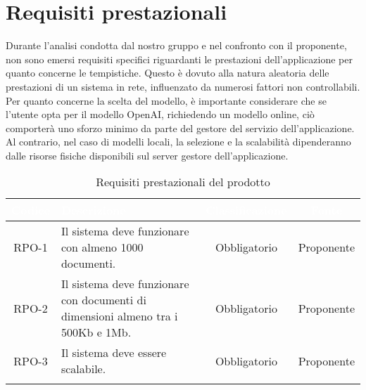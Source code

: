 \section{Requisiti prestazionali}

Durante l'analisi condotta dal nostro gruppo e nel confronto con il proponente, non sono emersi requisiti specifici riguardanti le prestazioni dell'applicazione per quanto concerne le tempistiche. Questo è dovuto alla natura aleatoria delle prestazioni di un sistema in rete, influenzato da numerosi fattori non controllabili.\\Per quanto concerne la scelta del modello, è importante considerare che se l'utente opta per il modello OpenAI, richiedendo un modello online, ciò comporterà uno sforzo minimo da parte del gestore del servizio dell'applicazione. Al contrario, nel caso di modelli locali, la selezione e la scalabilità dipenderanno dalle risorse fisiche disponibili sul server gestore dell'applicazione.\\
\begingroup
\setlength{\tabcolsep}{10pt}
\renewcommand{\arraystretch}{1.5}
\begin{xltabular}{\textwidth}{| c | X | c | c |}
    \hline
     \textbf{\textcolor{white}{Codice}} & \textbf{\textcolor{white}{Descrizione}} & \textbf{\textcolor{white}{Classificazione}} & \textbf{\textcolor{white}{Fonte}}\\
    \hline
    \endhead
    RPO-1 & Il sistema deve funzionare con almeno 1000 documenti.  & Obbligatorio & Proponente\\
    \hline
    RPO-2 & Il sistema deve funzionare con documenti di dimensioni almeno tra i 500Kb e 1Mb. & Obbligatorio & Proponente\\
    \hline
    RPO-3 & Il sistema deve essere scalabile. & Obbligatorio & Proponente\\
    \hline
     \caption{Requisiti prestazionali del prodotto}
    \label{tab:reqpre}
\end{xltabular}
\endgroup

